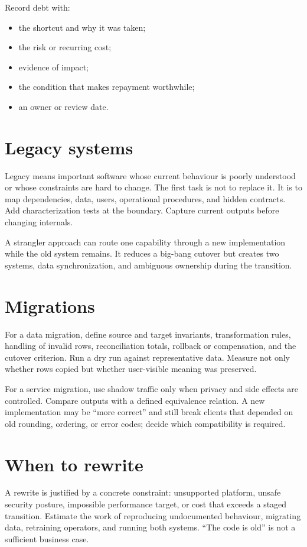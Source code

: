 Record debt with:

\begin{itemize}
  \item the shortcut and why it was taken;
  \item the risk or recurring cost;
  \item evidence of impact;
  \item the condition that makes repayment worthwhile;
  \item an owner or review date.
\end{itemize}

\section{Legacy systems}
Legacy means important software whose current behaviour is poorly understood or
whose constraints are hard to change. The first task is not to replace it. It
is to map dependencies, data, users, operational procedures, and hidden
contracts. Add characterization tests at the boundary. Capture current outputs
before changing internals.

A strangler approach can route one capability through a new implementation while
the old system remains. It reduces a big-bang cutover but creates two systems,
data synchronization, and ambiguous ownership during the transition.

\section{Migrations}
For a data migration, define source and target invariants, transformation rules,
handling of invalid rows, reconciliation totals, rollback or compensation, and
the cutover criterion. Run a dry run against representative data. Measure not
only whether rows copied but whether user-visible meaning was preserved.

For a service migration, use shadow traffic only when privacy and side effects
are controlled. Compare outputs with a defined equivalence relation. A new
implementation may be “more correct” and still break clients that depended on
old rounding, ordering, or error codes; decide which compatibility is required.

\section{When to rewrite}
A rewrite is justified by a concrete constraint: unsupported platform, unsafe
security posture, impossible performance target, or cost that exceeds a staged
transition. Estimate the work of reproducing undocumented behaviour, migrating
data, retraining operators, and running both systems. “The code is old” is not a
sufficient business case.

